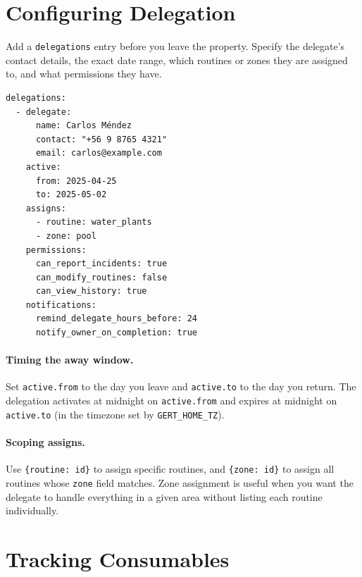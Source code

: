 \section{Configuring Delegation}
\label{sec:authoring-delegation}

Add a \texttt{delegations} entry before you leave the property. Specify the delegate's
contact details, the exact date range, which routines or zones they are assigned to, and
what permissions they have.

\begin{verbatim}
delegations:
  - delegate:
      name: Carlos Méndez
      contact: "+56 9 8765 4321"
      email: carlos@example.com
    active:
      from: 2025-04-25
      to: 2025-05-02
    assigns:
      - routine: water_plants
      - zone: pool
    permissions:
      can_report_incidents: true
      can_modify_routines: false
      can_view_history: true
    notifications:
      remind_delegate_hours_before: 24
      notify_owner_on_completion: true
\end{verbatim}

\paragraph{Timing the away window.}
Set \texttt{active.from} to the day you leave and \texttt{active.to} to the day you return.
The delegation activates at midnight on \texttt{active.from} and expires at midnight on
\texttt{active.to} (in the timezone set by \texttt{GERT\_HOME\_TZ}).

\paragraph{Scoping assigns.}
Use \texttt{\{routine: id\}} to assign specific routines, and \texttt{\{zone: id\}} to
assign all routines whose \texttt{zone} field matches. Zone assignment is useful when you want
the delegate to handle everything in a given area without listing each routine individually.

\section{Tracking Consumables}
\label{sec:authoring-consumables}

